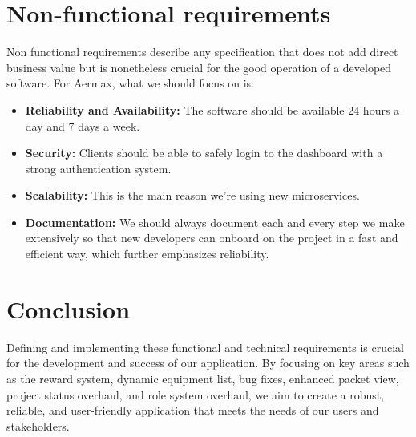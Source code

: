 \section{Non-functional requirements}
Non functional requirements describe any specification that does not add direct business value but is nonetheless crucial for the good operation of a developed software.
For Aermax, what we should focus on is:
\begin{itemize}
	\item \textbf{Reliability and Availability:} The software should be available 24 hours a day and 7 days a week.
	\item \textbf{Security:} Clients should be able to safely login to the dashboard with a strong authentication system.
	\item \textbf{Scalability:} This is the main reason we're using new microservices.
	\item \textbf{Documentation:} We should always document each and every step we make extensively so that new developers can onboard on the project in a fast and efficient way, which further emphasizes reliability.
\end{itemize}

\setcounter{secnumdepth}{0} %
\section{Conclusion}
Defining and implementing these functional and technical requirements is crucial for the development and success of our application. By focusing on key areas such as the reward system, dynamic equipment list, bug fixes, enhanced packet view, project status overhaul, and role system overhaul, we aim to create a robust, reliable, and user-friendly application that meets the needs of our users and stakeholders.
